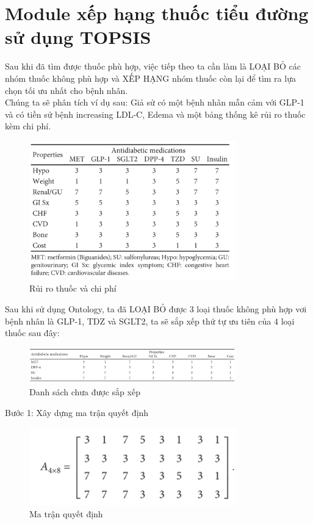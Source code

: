 \documentclass{article}
\begin{document}
\section{Module xếp hạng thuốc tiểu đường sử dụng TOPSIS}
Sau khi đã tìm được thuốc phù hợp, việc tiếp theo ta cần làm là LOẠI BỎ các nhóm thuốc không phù hợp và XẾP HẠNG nhóm thuốc còn lại để tìm ra lựa chọn tối ưu nhất cho bệnh nhân.
\\ Chúng ta sẽ phân tích ví dụ sau: Giả sử có một bệnh nhân mẫn cảm với GLP-1 và có tiền sử bệnh increasing LDL-C, Edema và một bảng thống kê rủi ro thuốc kèm chi phí.
\begin{figure}[H]
    \centering
    \includegraphics[width=0.8\textwidth]{o6.png}
    \caption{Rủi ro thuốc và chi phí}
    \label{dongco}
\end{figure}
Sau khi sử dụng Ontology, ta đã LOẠI BỎ được 3 loại thuốc không phù hợp vơi bệnh nhân là GLP-1, TDZ và SGLT2, ta sẽ
sắp xếp thứ tự ưu tiên của 4 loại thuốc sau đây:
\begin{figure}[H]
    \centering
    \includegraphics[width=0.8\textwidth]{o7.png}
    \caption{Danh sách chưa được sắp xếp}
    \label{dongco}
\end{figure}
Bước 1: Xây dựng ma trận quyết định
\begin{figure}[H]
    \centering
    \includegraphics[width=0.8\textwidth]{o8.png}
    \caption{Ma trận quyết định}
    \label{dongco}
\end{figure}
\end{document}
